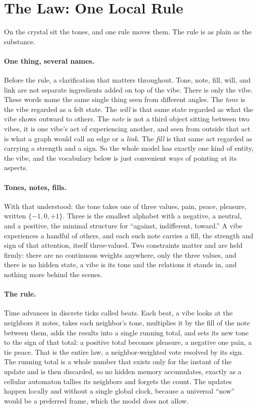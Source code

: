 \section{The Law: One Local Rule}
\label{sec:rule}

On the crystal sit the tones, and one rule moves them. The rule is as plain as the substance.

\paragraph{One thing, several names.}
Before the rule, a clarification that matters throughout. Tone, note, fill, will, and link are
not separate ingredients added on top of the vibe. There is only the vibe. These words name the
same single thing seen from different angles. The \emph{tone} is the vibe regarded as a felt
state. The \emph{will} is that same state regarded as what the vibe shows outward to others.
The \emph{note} is not a third object sitting between two vibes, it is one vibe's act of
experiencing another, and seen from outside that act is what a graph would call an edge or a
\emph{link}. The \emph{fill} is that same act regarded as carrying a strength and a sign. So
the whole model has exactly one kind of entity, the vibe, and the vocabulary below is just
convenient ways of pointing at its aspects.

\paragraph{Tones, notes, fills.}
With that understood: the tone takes one of three values, pain, peace, pleasure, written
$\{-1, 0, +1\}$. Three is the smallest alphabet with a negative, a neutral, and a positive, the
minimal structure for ``against, indifferent, toward.'' A vibe experiences a handful of others,
and each such note carries a fill, the strength and sign of that attention, itself three-valued.
Two constraints matter and are held firmly: there are no continuous weights anywhere, only the
three values, and there is no hidden state, a vibe is its tone and the relations it stands in,
and nothing more behind the scenes.

\paragraph{The rule.}
Time advances in discrete ticks called beats. Each beat, a vibe looks at the neighbors it
notes, takes each neighbor's tone, multiplies it by the fill of the note between them, adds the
results into a single running total, and sets its new tone to the sign of that total: a
positive total becomes pleasure, a negative one pain, a tie peace. That is the entire law, a
neighbor-weighted vote resolved by its sign. The running total is a whole number that exists
only for the instant of the update and is then discarded, so no hidden memory accumulates,
exactly as a cellular automaton tallies its neighbors and forgets the count. The updates happen
locally and without a single global clock, because a universal ``now'' would be a preferred
frame, which the model does not allow.


